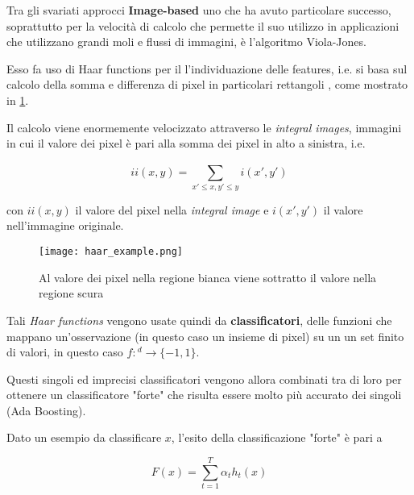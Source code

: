 Tra gli svariati approcci \textbf{Image-based} uno che ha avuto particolare successo, soprattutto per la 
velocità di calcolo che permette il suo utilizzo in applicazioni che utilizzano grandi 
moli e flussi di immagini, è l'algoritmo Viola-Jones.

\medskip

Esso fa uso di Haar functions per il l'individuazione delle features, i.e. 
si basa sul calcolo della somma e differenza di pixel in particolari rettangoli 
\cite{Viola2004}, come mostrato in \ref{fig:haar}.

Il calcolo viene enormemente velocizzato attraverso le \textit{integral images}, 
immagini in cui il valore dei pixel è pari alla somma dei pixel in alto a sinistra, i.e.

\begin{equation}
    ii(x,y) = \sum_{x'\leq x, y' \leq y}^{} i(x', y')
    \label{eq:}
\end{equation}

con $ii(x,y)$ il valore del pixel nella \textit{integral image} e $i(x',y')$ 
il valore nell'immagine originale.

\begin{figure}
    \begin{small}
        \begin{center}
            \texttt{[image: haar\_example.png]}
        \end{center}
        \caption{Al valore dei pixel nella regione bianca viene sottratto il valore nella regione scura 
            \cite{Viola2004}}
        \label{fig:haar}
    \end{small}
\end{figure}

\medskip

Tali \textit{Haar functions} vengono usate quindi da \textbf{classificatori}, 
delle funzioni che mappano un'osservazione (in questo caso un insieme di pixel) su un un set finito di valori, 
in questo caso \cite{Wang2014}
$f:$\Rset$^d\rightarrow \{-1, 1\}$.

Questi singoli ed imprecisi classificatori vengono allora combinati tra di loro
per ottenere un classificatore "forte" che risulta essere molto più accurato \cite{Schapire2013} dei singoli (Ada Boosting).

Dato un esempio da classificare $x$, l'esito della classificazione "forte" è pari a 

\begin{equation}
    F(x) = \sum_{t=1}^{T} \alpha_t h_t(x)
    \label{eq:}
\end{equation}

